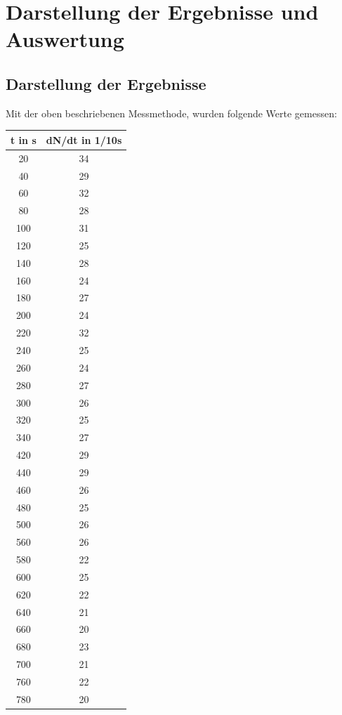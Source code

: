 \section{Darstellung der Ergebnisse und Auswertung}

\subsection{Darstellung der Ergebnisse}
Mit der oben beschriebenen Messmethode, wurden folgende Werte gemessen:
\begin{table}

\begin{tabular}{|c|c|}
\hline 
t in s & dN/dt in 1/10s \\ 
\hline
20	&34\\ 
\hline
40	&29\\ 
\hline
60	&32\\ 
\hline
80	&28\\ 
\hline
100	&31\\ 
\hline
120	&25\\ 
\hline
140	&28\\ 
\hline
160	&24\\ 
\hline
180	&27\\ 
\hline
200	&24\\ 
\hline
220	&32\\ 
\hline
240	&25\\ 
\hline
260	&24\\ 
\hline
280	&27\\ 
\hline	
300	&26\\ 
\hline
320	&25\\ 
\hline
340	&27\\ 
\hline
420	&29\\ 
\hline	
440	&29\\ 
\hline
460	&26\\ 
\hline
480	&25\\ 
\hline
500	&26\\ 
\hline
560	&26\\ 
\hline
580	&22\\ 
\hline	
600	&25\\ 
\hline
620	&22\\ 
\hline
640	&21\\ 
\hline
660	&20\\ 
\hline
680	&23\\ 
\hline
700	&21\\ 
\hline
760	&22\\ 
\hline
780	&20\\ 

\end{tabular}
\end{table}
